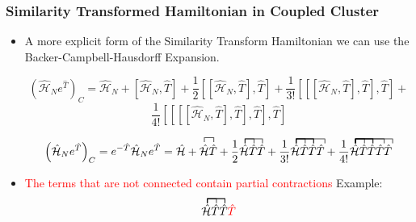 \documentclass{beamer}
\begin{document}
\begin{frame}
\frametitle{Similarity Transformed Hamiltonian  in Coupled Cluster}

\begin{footnotesize}
\begin{itemize}
\item A more explicit form of the Similarity Transform Hamiltonian we can use the Backer-Campbell-Hausdorff Expansion.

\[
\left( \hat{\mathcal{H}}_{N} e^{\hat{T}} \right)_{C}= \hat{\mathcal{H}}_{N} + \left[ \hat{\mathcal{H}}_{N},\hat{T} \right]+\frac{1}{2}\left[ \left[ \hat{\mathcal{H}}_{N},\hat{T} \right],\hat{T} \right] +\frac{1}{3!}\left[\left[ \left[ \hat{\mathcal{H}}_{N},\hat{T} \right],\hat{T} \right] ,\hat{T} \right] 	+ 
\]
\begin{equation}
\frac{1}{4!}\left[\left[\left[ \left[ \hat{\mathcal{H}}_{N},\hat{T} \right],\hat{T} \right] ,\hat{T} \right],\hat{T} \right]
\end{equation}

\begin{equation}
\left( \hat{\mathcal{H}}_{N} e^{\hat{T}} \right)_{C}=e^{-\hat{T}}  \hat{\mathcal{H}}_{N} e^{\hat{T}}=   \hat{\mathcal{H}} +   \contraction{} { \hat{\mathcal{H}}}{}{ {\hat{T}}} 
  \hat{\mathcal{H}} \hat{T} + 
 \frac{1}{2}\contraction{}{ \bar{11}}{}{\bar{1}} 
    \contraction{} { \bar{11}}{1}{ {\hat{11}}} 
 \hat{\mathcal{H}} \hat{T} \hat{T}  +
\frac{1}{3!}  \contraction{}{ \bar{11}}{}{\bar{1}} 
    \contraction{} { \bar{11}}{1}{ {\hat{11}}} 
 \contraction{} { \bar{11}}{1}{ {\hat{11}}}
 \contraction{} { \bar{11}}{1}{ {\hat{111111}}}
\hat{\mathcal{H}} \hat{T} \hat{T} \hat{T}  +
\frac{1}{4!}  \contraction{}{ \bar{11}}{}{\bar{1}} 
    \contraction{} { \bar{11}}{1}{ {\hat{11}}} 
 \contraction{} { \bar{11}}{1}{ {\hat{11}}}
 \contraction{} { \bar{11}}{1}{ {\hat{111111}}}
 \contraction{} { \bar{11}}{1}{ {\hat{111111111}}}
\hat{\mathcal{H}} \hat{T} \hat{T} \hat{T}  \hat{T} 
\end{equation}
\item \textcolor{red}{The terms that are not connected contain partial contractions}
Example:
\[
\contraction{}{ \bar{11}}{}{\bar{1}} 
    \contraction{} { \bar{11}}{1}{ {\hat{11}}} 
 \contraction{} { \bar{11}}{1}{ {\hat{11}}}
\hat{\mathcal{H}} \hat{T} \hat{T} \textcolor{red}{ \hat{T}} 
\]
\end{itemize}

\end{footnotesize}


\end{frame}
\end{document}
